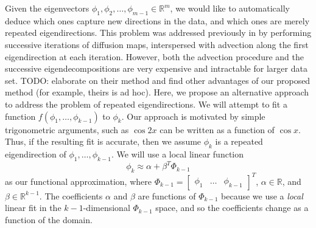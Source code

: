 \documentclass[preprint]{elsarticle}
\begin{document}
Given the eigenvectors $\phi_1, \phi_2, \dots, \phi_{m-1} \in \mathbb{R}^m$, we would like to automatically deduce which ones capture new directions in the data, and which ones are merely repeated eigendirections. 
%
This problem was addressed previously in \cite{...} by performing successive iterations of diffusion maps, interspersed with advection along the first eigendirection at each iteration. 
%
However, both the advection procedure and the successive eigendecompositions are very expensive and intractable for larger data set. 
TODO: elaborate on their method and find other advantages of our proposed method (for example, theirs is ad hoc). 
%
Here, we propose an alternative approach to address the problem of repeated eigendirections. 
%
We will attempt to fit a function $f(\phi_1, \dots, \phi_{k-1})$ to $\phi_{k}$. 
%
Our approach is motivated by simple trigonometric arguments, such as $\cos2x$ can be written as a function of $\cos x$. 
%
Thus, if the resulting fit is accurate, then we assume $\phi_{k}$ is a repeated eigendirection of $\phi_1, \dots, \phi_{k-1}$. 
%
We will use a local linear function 
\begin{equation}
\phi_k \approx \alpha + \beta^T \Phi_{k-1}
\end{equation}
%
as our functional approximation, where 
%
$\Phi_{k-1} = \begin{bmatrix} \phi_1 & \dots & \phi_{k-1} \end{bmatrix}^T$,
$\alpha \in \mathbb{R}$, and $\beta \in \mathbb{R}^{k-1}$. 
%
The coefficients $\alpha$ and $\beta$ are functions of $\Phi_{k-1}$ because we use a {\em local} linear fit in the $k-1$-dimensional $\Phi_{k-1}$ space, and so the coefficients change as a function of the domain. 
\end{document}
